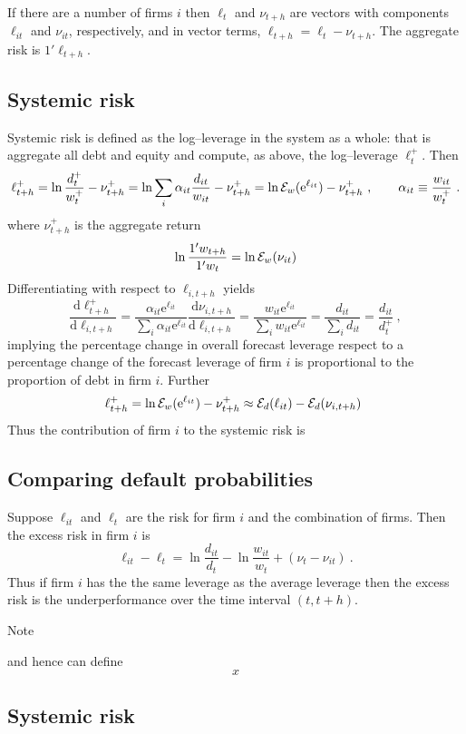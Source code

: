 \documentclass[authoryear]{elsarticle}
\newcommand{\e}{\mathrm{e}}
\newcommand{\Ex}{{\cal E}}
\newcommand{\de}{\mathrm{d}}
\newcommand{\cq}{\ , \qquad}
\begin{document}
If there are a number of  firms $i$ then $\ell_t$ and $\nu_{t+h}$ are  vectors with components $\ell_{it}$ and $\nu_{it}$, respectively, and in vector terms, $\ell_{t+h}=\ell_t - \nu_{t+h}$.   The aggregate risk is $1'\ell_{t+h}$.


\subsection{Systemic risk}

Systemic risk is defined as the log--leverage in the system as a whole:   that is  aggregate all debt and equity and compute, as above, the log--leverage $\ell_t^+$.    Then
$$
\ell^+_{t+h} = \ln \frac{d^+_t}{w^+_t}-\nu^+_{t+h} =  \ln \sum_i\alpha_{it}\frac{ d_{it}}{ w_{it}} -\nu^+_{t+h}= \ln \Ex_w(\e^{\ell_{it}})-\nu^+_{t+h} \cq \alpha_{it}\equiv\frac{w_{it}}{ w^+_t}\ .
$$
where $\nu_{t+h}^+$ is the aggregate return
$$
\ln \frac{1'w_{t+h}}{1'w_t} = \ln\Ex_w(\nu_{it})
$$
Differentiating with respect to $\ell_{i,t+h}$ yields
$$
\frac{\de \ell^+_{t+h}}{\de \ell_{i,t+h}} = \frac{\alpha_{it}\e^{\ell_{it}}}{\sum_i\alpha_{it}\e^{\ell_{it}}} \frac{\de\nu_{i,t+h}}{\de \ell_{i,t+h}}=\frac{w_{it}\e^{\ell_{it}}}{\sum_iw_{it}\e^{\ell_{it}}}
=\frac{d_{it}}{\sum_id_{it}}=\frac{d_{it}}{d_t^+}\ ,
$$
implying the percentage change in overall forecast leverage respect to a percentage change of the forecast leverage of  firm $i$ is proportional to the proportion of debt in firm $i$.   Further 
$$
\ell^+_{t+h} = \ln \Ex_w(\e^{\ell_{it}})-\nu^+_{t+h} \approx \Ex_d(\ell_{it})-\Ex_d(\nu_{i,t+h})\
$$
Thus the contribution of firm $i$ to the systemic risk is 


\subsection{Comparing default probabilities}

Suppose $\ell_{it}$ and $\ell_{t}$ are the risk for firm $i$ and the combination of firms.   Then the excess risk in firm $i$ is
$$
\ell_{it}-\ell_t = \ln \frac{d_{it}}{d_t} - \ln \frac{w_{it}}{w_t} + (\nu_t-\nu_{it})\ .
$$
Thus if firm $i$ has the the same leverage as the average leverage then the excess risk is the underperformance over the time interval $(t,t+h)$. 

Note

and hence can define
$$
x
$$


\subsection{Systemic risk}
\end{document}
